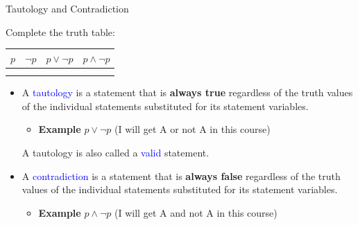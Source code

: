 \documentclass[aspectratio=169]{beamer}
\providecommand{\Blue}[1]{\textcolor{blue}{#1}}
\begin{document}
\begin{frame}[plain]{Tautology and Contradiction}%

  Complete the truth table:
  
      \begin{center}
        \begin{tabular}{|c|c|c|c|}\hline
          $p$ & $\neg p$ &  $p\vee \neg p$ & $p\wedge \neg p$ \\ \hline
            	&  & & \\ \hline
               &   &  & \\ \hline            
        \end{tabular}
	\end{center}  
	\pause 

\begin{itemize}
 \item  A \Blue{tautology} is a statement that is {\bf always true} regardless of the truth values of the individual statements 
 substituted for its statement variables.
    \begin{itemize}
     \item {\bf Example} $p\vee \neg p$ (I will get A or not A in this course)
    \end{itemize}
    A tautology is also called a \Blue{valid} statement.
  \item A \Blue{contradiction} is a statement that is {\bf always false} regardless of the truth values of the individual statements 
 substituted for its statement variables. 
   \begin{itemize}
     \item {\bf Example} $p\wedge \neg p$ (I will get A and not A in this course)
    \end{itemize}
 \end{itemize}
 
    
     
\end{frame}
\end{document}
